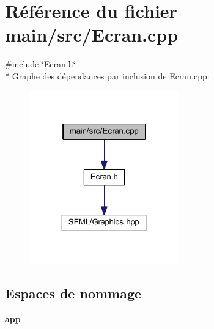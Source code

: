 \section{Référence du fichier main/src/\+Ecran.cpp}
\label{_ecran_8cpp}
{\ttfamily \#include \char`\"{}Ecran.\+h\char`\"{}}\\*
Graphe des dépendances par inclusion de Ecran.\+cpp\+:\nopagebreak
\begin{figure}[H]
\begin{center}
\leavevmode
\includegraphics[width=184pt]{_ecran_8cpp__incl}
\end{center}
\end{figure}
\subsection*{Espaces de nommage}
\begin{DoxyCompactItemize}
\item 
 {\bf app}
\end{DoxyCompactItemize}
